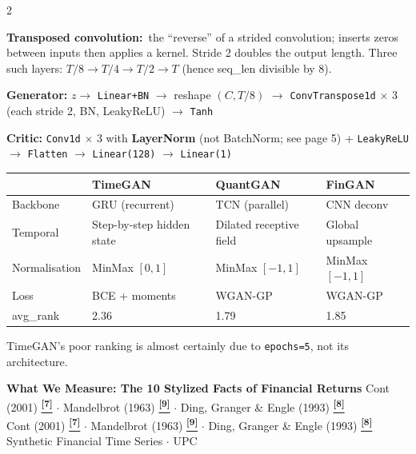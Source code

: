 \documentclass[10pt]{article}
\newcommand{\navybox}[2]{\begin{tcolorbox}[mybox={Navy}{LBg},title={#1}]#2\end{tcolorbox}}
\newcommand{\pagehead}[2]{%
  \begin{tcolorbox}[enhanced,arc=0pt,outer arc=0pt,boxrule=0pt,
    colback=Navy,colframe=Navy,
    top=5pt,bottom=5pt,left=8pt,right=8pt,
    before skip=0pt,after skip=10pt]
  {\color{white}\large\bfseries #1}%
  \ifx\relax#2\relax\else\\[1pt]{\color{blue!30!white}\small #2}\fi
  \hfill{\color{blue!20!white}\footnotesize Synthetic Financial Time Series $\cdot$ UPC}
  \end{tcolorbox}}
\newcommand{\tcite}[1]{%
  \hyperlink{R:#1}{\textsuperscript{\scriptsize\textbf{[#1]}}}}
\begin{document}
\begin{multicols}{2}
\columnbreak

\begin{tcolorbox}[mybox={FGcol}{GBg},title={FinGAN --- CNN Deconvolution WGAN-GP}]
\textbf{Transposed convolution:}\ the ``reverse'' of a strided convolution; inserts zeros between inputs then applies a kernel. Stride 2 doubles the output length. Three such layers: $T/8 \to T/4 \to T/2 \to T$ (hence seq\_len divisible by 8).

\textbf{Generator:} $z \to$ \texttt{Linear+BN} $\to$ reshape $(C, T/8)$ $\to$ \texttt{ConvTranspose1d} $\times$ 3 (each stride 2, BN, LeakyReLU) $\to$ \texttt{Tanh}

\textbf{Critic:} \texttt{Conv1d} $\times$ 3 with \textbf{LayerNorm} (not BatchNorm; see page 5) + \texttt{LeakyReLU} $\to$ \texttt{Flatten} $\to$ \texttt{Linear(128)} $\to$ \texttt{Linear(1)}
\end{tcolorbox}

\navybox{Architectural Comparison}{%
\small\renewcommand{\arraystretch}{1.3}
\begin{tabularx}{\linewidth}{@{}lXXX@{}}
\toprule
& \textbf{TimeGAN} & \textbf{QuantGAN} & \textbf{FinGAN} \\
\midrule
Backbone      & GRU (recurrent)          & TCN (parallel)          & CNN deconv \\
Temporal      & Step-by-step hidden state & Dilated receptive field & Global upsample \\
Normalisation & MinMax $[0,1]$            & MinMax $[-1,1]$         & MinMax $[-1,1]$ \\
Loss          & BCE + moments             & WGAN-GP                 & WGAN-GP \\
avg\_rank     & 2.36                      & 1.79                    & 1.85 \\
\bottomrule
\end{tabularx}
\footnotesize TimeGAN's poor ranking is almost certainly due to \texttt{epochs=5}, not its architecture.}

\end{multicols}

\clearpage

\pagehead{What We Measure: The 10 Stylized Facts of Financial Returns}
         {Cont (2001)\tcite{7} $\cdot$ Mandelbrot (1963)\tcite{9} $\cdot$ Ding, Granger \& Engle (1993)\tcite{8}}
\end{document}
